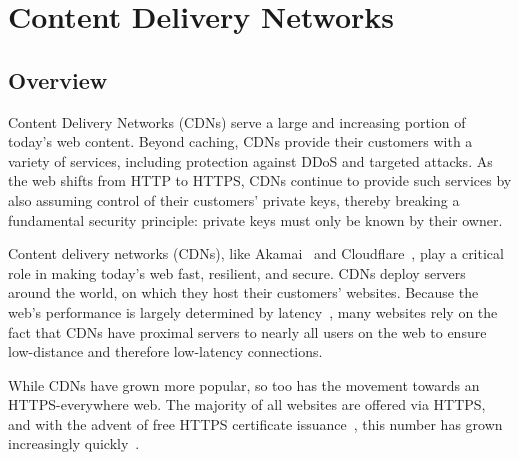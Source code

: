 \section{Content Delivery Networks}
\label{sec:cdn}

\subsection{Overview}

Content Delivery Networks (CDNs) serve a large and increasing portion of
today's web content.
%
Beyond caching, CDNs provide their customers with a variety of services,
including protection against DDoS and targeted attacks.
%
%
As the web shifts from HTTP to HTTPS, CDNs continue to provide such services by
also assuming control of their customers' private keys, thereby breaking a
fundamental security principle: private keys must only be known by their owner.

%


Content delivery networks (CDNs), like Akamai~\cite{akamai} and
Cloudflare~\cite{cloudflare}, play a critical role in making today's web fast,
resilient, and secure.
%
CDNs deploy servers around the world, on which they host their customers'
websites.
%
Because the web's performance is largely determined by
latency~\cite{why-internet-slow}, many websites rely on the fact that CDNs have
proximal servers to nearly all users on the web to ensure low-distance and
therefore low-latency connections.


While CDNs have grown more popular, so too has the movement towards an
HTTPS-everywhere web.
%
The majority of all websites are offered via HTTPS, and with the advent of free
HTTPS certificate issuance~\cite{lets-encrypt}, this number has grown
increasingly quickly~\cite{felt-2017-https}.


